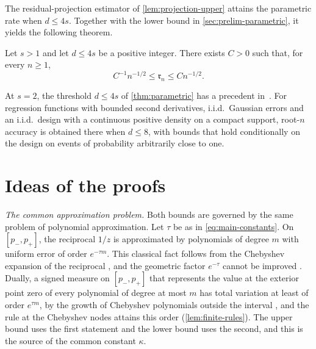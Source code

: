 The residual-projection estimator of \cref{lem:projection-upper}
attains the parametric rate when $d\le4s$. Together with the lower
bound in \cref{sec:prelim-parametric}, it yields the following theorem.
\begin{theorem}\label{thm:parametric}
Let $s>1$ and let $d\le4s$ be a positive integer. There exists $C>0$
such that, for every $n\ge1$,
\begin{equation}\label{eq:parametric-rate}
 C^{-1}n^{-1/2}\le\mathfrak r_n\le Cn^{-1/2}.
\end{equation}
\end{theorem}


At $s=2$, the threshold $d\le4s$ of \cref{thm:parametric} has a
precedent in~\cite[Section~3.1]{Spokoiny2002}. For regression functions
with bounded second derivatives, i.i.d.\ Gaussian errors and an
i.i.d.\ design with a continuous positive density on a compact support,
root-$n$ accuracy is obtained there
when $d\le8$, with bounds that hold conditionally on the design on
events of probability arbitrarily close to one.

\section{Ideas of the proofs}\label{sec:intro-ideas}

\emph{The common approximation problem.} Both bounds are governed
by the same problem of polynomial approximation. Let $\tau$ be as in
\eqref{eq:main-constants}. On $[p_-,p_+]$, the reciprocal $1/z$ is
approximated by polynomials of degree $m$ with uniform error of order
$e^{-\tau m}$. This classical fact follows from the Chebyshev expansion
of the reciprocal \cite[equation~(2.4)]{Mathar2006}, and the geometric
factor $e^{-\tau}$ cannot be improved
\cite[Corollary~2.2]{KrausEtAl2012}. Dually, a signed measure on
$[p_-,p_+]$ that represents the value at the exterior point zero of
every polynomial of degree at most $m$ has total variation at least of
order $e^{\tau m}$, by the growth of Chebyshev polynomials outside the
interval \cite[Section~2.7, equation~(2.37)]{Rivlin1990}, and the rule
at the Chebyshev nodes attains this order (\cref{lem:finite-rules}).
The upper bound uses the first statement and the lower bound uses the
second, and this is the source of the common constant $\kappa$.

